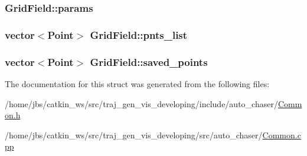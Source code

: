 \subsubsection[{\texorpdfstring{params}{params}}]{ Grid\+Field\+::params}\hypertarget{struct_grid_field_a735e3033049d10f084e74083ae44dd21}{}\label{struct_grid_field_a735e3033049d10f084e74083ae44dd21}
\subsubsection[{\texorpdfstring{pnts\+\_\+list}{pnts_list}}]{\setlength{\rightskip}{0pt plus 5cm}vector$<$Point$>$ Grid\+Field\+::pnts\+\_\+list}\hypertarget{struct_grid_field_a76901c3a463e8cbe456c8f73bc264380}{}\label{struct_grid_field_a76901c3a463e8cbe456c8f73bc264380}
\subsubsection[{\texorpdfstring{saved\+\_\+points}{saved_points}}]{\setlength{\rightskip}{0pt plus 5cm}vector$<$Point$>$ Grid\+Field\+::saved\+\_\+points}\hypertarget{struct_grid_field_ad5dc16fb46eef17df3a554f5b5604611}{}\label{struct_grid_field_ad5dc16fb46eef17df3a554f5b5604611}


The documentation for this struct was generated from the following files\+:\begin{DoxyCompactItemize}
\item 
/home/jbs/catkin\+\_\+ws/src/traj\+\_\+gen\+\_\+vis\+\_\+developing/include/auto\+\_\+chaser/\hyperlink{_common_8h}{Common.\+h}\item 
/home/jbs/catkin\+\_\+ws/src/traj\+\_\+gen\+\_\+vis\+\_\+developing/src/auto\+\_\+chaser/\hyperlink{_common_8cpp}{Common.\+cpp}\end{DoxyCompactItemize}
